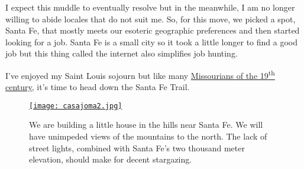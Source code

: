 I expect this muddle to eventually resolve but in the meanwhile, I am no
longer willing to abide locales that do not suit me. So, for this move,
we picked a spot, Santa Fe, that mostly meets our esoteric geographic
preferences and then started looking for a job. Santa Fe is a small city
so it took a little longer to find a good job but this thing called the
internet also simplifies job hunting.

I've enjoyed my Saint Louis sojourn but like many
\href{https://earthstonestation.com/2012/08/30/santa-fe-trail-diary-of-susan-magoffin/}{Missourians
of the 19\textsuperscript{th} century}, it's time to head down the Santa
Fe Trail.

\begin{SCfigure}
\centering
\href{https://bakerjd99.wordpress.com/casajoma2/}{\texttt{[image: casajoma2.jpg]}}
\caption{We are building a little house in the hills near Santa Fe. We will have
unimpeded views of the mountains to the north. The lack of street
lights, combined with Santa Fe's two thousand meter elevation, should make for
decent stargazing.}
\label{fig:5241X0}
\end{SCfigure}




%
%



%
